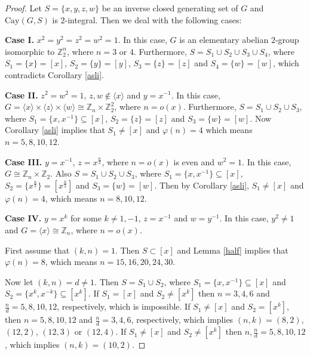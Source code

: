\documentclass[10pt,a4paper]{amsart}
\begin{document}
	\begin{proof}
		Let $S=\{x,y,z,w\}$ be an inverse closed generating set of $G$ and $\mathrm{Cay}(G,S)$  is $2$-integral. Then we deal with the following cases:
		
		\textbf{Case I.} $x^2=y^2=z^2=w^2=1$. In this case, $G$ is an elementary abelian $2$-group isomorphic to $\mathbb Z_2^n$, where $n=3$ or $4$. Furthermore, $S=S_1\cup S_2\cup S_3\cup S_4$,
		where $S_1=\{x\}=[x]$, $S_2=\{y\}=[y]$, $S_3=\{z\}=[z]$ and $S_4=\{w\}=[w]$, which contradicts Corollary \ref{asli}.
		
		\textbf{Case II.} $z^2=w^2=1$, $z,w\notin\langle x\rangle$  and $y=x^{-1}$. In this case, $G=\langle x\rangle\times\langle z\rangle\times\langle w\rangle\cong\mathbb Z_n\times\mathbb{Z}_2^2$, where $n=o(x)$. Furthermore, $S=S_1\cup S_2\cup S_3$, where $S_1=\{x,x^{-1}\}\subseteq [x]$, $S_2=\{z\}=[z]$ and $S_3=\{w\}=[w]$. Now Corollary \ref{asli} implies
		that $S_1\neq [x]$ and $\varphi(n)=4$ which means $n=5,8,10,12$.
		
		\textbf{Case III.} $y=x^{-1}$, $z=x^{\frac{n}{2}}$, where $n=o(x)$ is even and $w^2=1$. In this case, $G\cong\mathbb Z_n\times\mathbb Z_2$. Also $S=S_1\cup S_2\cup S_3$, where
		$S_1=\{x,x^{-1}\}\subseteq [x]$, $S_2=\{x^\frac{n}{2}\}=[x^\frac{n}{2}]$ and $S_3=\{w\}=[w]$. Then by Corollary \ref{asli}, $S_1\neq [x]$ and $\varphi(n)=4$, which means $n=8,10,12$.
		
		\textbf{Case IV.} $y=x^k$ for some $k\neq 1,-1$, $z=x^{-1}$ and $w=y^{-1}$. In this case, $y^2\neq 1$ and $G=\langle x\rangle\cong\mathbb Z_n$, where $n=o(x)$. 
		
		First assume that $(k,n)=1$. Then $S\subset [x]$ and Lemma \ref{half} implies that $\varphi(n)=8$, which means $n=15,16,20,24,30$. 
		
		Now let $(k,n)=d\neq 1$. Then $S=S_1\cup S_2$, where $S_1=\{x,x^{-1}\}\subseteq [x]$ and $S_2=\{x^k,x^{-k}\}\subseteq [x^k]$. 
		If $S_1=[x]$ and $S_2\neq[x^k]$ then $n=3,4,6$ and $\frac{n}{d}=5,8,10,12$, respectively, which is impossible.
		If $S_1\neq [x]$ and $S_2=[x^k]$, then $n=5,8,10,12$ and $\frac{n}{d}=3,4,6$, respectively, which implies $(n,k)=(8,2)$, $(12,2)$, $(12,3)$ or $(12,4)$.
		If $S_1\neq [x]$ and $S_2\neq [x^k]$ then $n,\frac{n}{d}=5,8,10,12$, which implies $(n,k)=(10,2)$.
		

\end{proof}
\end{document}
